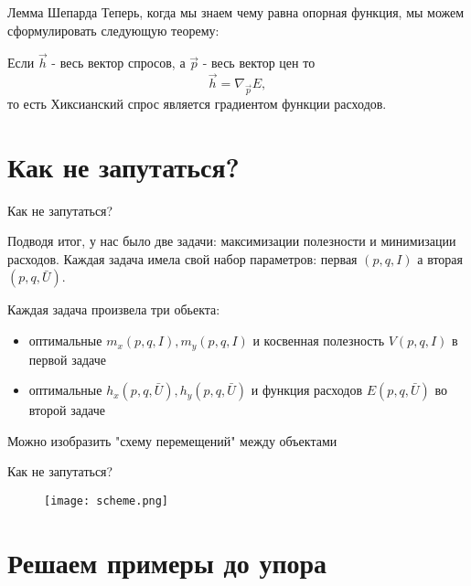 \documentclass{beamer}
\begin{document}
\begin{frame}{Лемма Шепарда}
Теперь, когда мы знаем чему равна опорная функция, мы можем сформулировать следующую теорему:
\begin{theorem}
Если $\vec{h}$ - весь вектор спросов, а $\vec{p}$ - весь вектор цен то
$$\vec{h} = \nabla_{\vec{p}} E,$$
то есть Хиксианский спрос является градиентом функции расходов.
\end{theorem}
\end{frame}

\section{Как не запутаться?}

\begin{frame}{Как не запутаться?}

Подводя итог, у нас было две задачи: максимизации полезности и минимизации расходов. Каждая задача имела свой набор параметров: первая $(p,q,I)$ а вторая $(p,q,\bar U)$. 

Каждая задача произвела три обьекта:

\begin{itemize}
\item оптимальные $m_x(p,q,I), m_y(p,q,I)$ и косвенная полезность $V(p,q,I)$ в первой задаче
\item оптимальные $h_x(p,q,\bar U), h_y(p,q,\bar U)$ и функция расходов $E(p,q,\bar U)$ во второй задаче
\end{itemize}
Можно изобразить "схему перемещений" между объектами

\end{frame}

\begin{frame}{Как не запутаться?}

\begin{figure}[hbt]
\centering
\texttt{[image: scheme.png]}
\end{figure}

\end{frame}

\section{Решаем примеры до упора}
\end{document}
